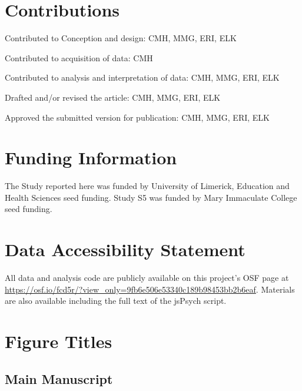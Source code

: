 \documentclass[
  man,floatsintext]{apa6}
\begin{document}
\newpage

\setlength{\parindent}{0.0in}
\setlength{\leftskip}{0.0in}
\setlength{\parskip}{8pt}

\hypertarget{contributions}{%
\section{Contributions}\label{contributions}}

Contributed to Conception and design: CMH, MMG, ERI, ELK

Contributed to acquisition of data: CMH

Contributed to analysis and interpretation of data: CMH, MMG, ERI, ELK

Drafted and/or revised the article: CMH, MMG, ERI, ELK

Approved the submitted version for publication: CMH, MMG, ERI, ELK

\hypertarget{funding-information}{%
\section{Funding Information}\label{funding-information}}

The Study reported here was funded by University of Limerick, Education and Health Sciences seed funding. Study S5 was funded by Mary Immaculate College seed funding.

\hypertarget{data-accessibility-statement}{%
\section{Data Accessibility Statement}\label{data-accessibility-statement}}

All data and analysis code are publicly available on this project's OSF page at \url{https://osf.io/fcd5r/?view_only=9fb6e506e53340c189b98453bb2b6eaf}. Materials are also available including the full text of the jsPsych script.

\hypertarget{figure-titles}{%
\section{Figure Titles}\label{figure-titles}}

\hypertarget{main-manuscript}{%
\subsection{Main Manuscript}\label{main-manuscript}}
\end{document}
